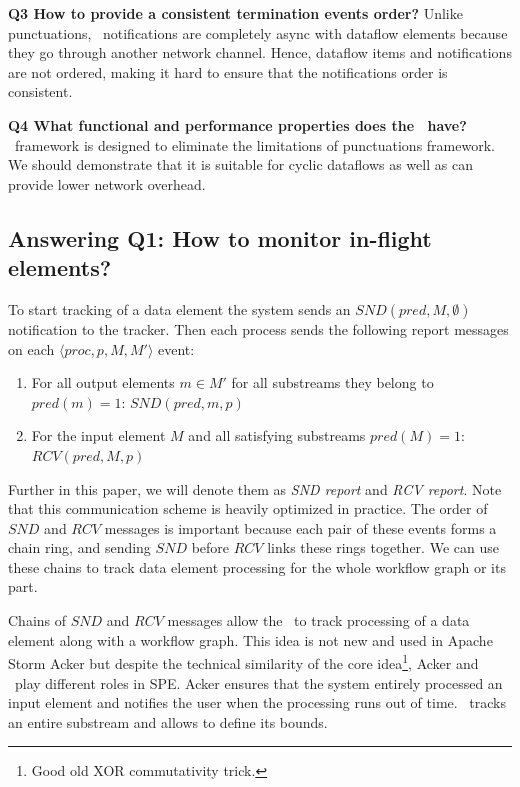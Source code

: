 {\bf Q3 How to provide a consistent termination events order?} Unlike punctuations, \tracker\ notifications are completely async with dataflow elements because they go through another network channel. Hence, dataflow items and notifications are not ordered, making it hard to ensure that the notifications order is consistent.

{\bf Q4 What functional and performance properties does the \tracker\ have?} \tracker\ framework is designed to eliminate the limitations of punctuations framework. We should demonstrate that it is suitable for cyclic dataflows as well as can provide lower network overhead.

\subsection{Answering Q1: How to monitor in-flight elements?}
To start tracking of a data element the system sends an $SND(pred, M, \emptyset)$ notification to the tracker. Then each process sends the following report messages on each $\langle proc, p, M, M' \rangle$ event:
\begin{enumerate}
    \item For all output elements $m \in M'$ for all substreams they belong to $pred(m) = 1$: $SND(pred, m, p)$
    \item For the input element $M$ and all satisfying substreams $pred(M) = 1$: $RCV(pred, M, p)$
\end{enumerate}
Further in this paper, we will denote them as {\em SND report} and {\em RCV report}. Note that this communication scheme is heavily optimized in practice. The order of $SND$ and $RCV$ messages is important because each pair of these events forms a chain ring, and sending $SND$ before $RCV$ links these rings together. We can use these chains to track data element processing for the whole workflow graph or its part.

Chains of $SND$ and $RCV$ messages allow the \tracker\ to track processing of a data element along with a workflow graph. This idea is not new and used in Apache Storm Acker but despite the technical similarity of the core idea\footnote{Good old XOR commutativity trick.}, Acker and \tracker\ play different roles in SPE. Acker ensures that the system entirely processed an input element and notifies the user when the processing runs out of time. \tracker\ tracks an entire substream and allows to define its bounds.

